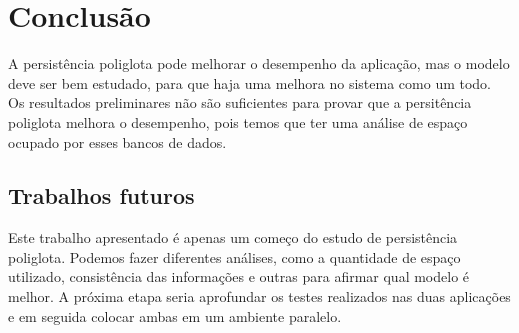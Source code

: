 %
%

\chapter{Conclusão}
\label{chap:conclusao}

A persistência poliglota pode melhorar o desempenho da aplicação, mas o modelo deve ser bem estudado, para que haja uma melhora no sistema como um todo. Os resultados preliminares não são suficientes para provar que a persitência poliglota melhora o desempenho, pois temos que ter uma análise de espaço ocupado por esses bancos de dados.


\section{Trabalhos futuros}
\label{sec:trabalhosFuturos}

Este trabalho apresentado é apenas um começo do estudo de persistência poliglota. Podemos fazer diferentes análises, como a quantidade de espaço utilizado, consistência das informações e outras para afirmar qual modelo é melhor. A próxima etapa seria aprofundar os testes realizados nas duas aplicações e em seguida colocar ambas em um ambiente paralelo.
